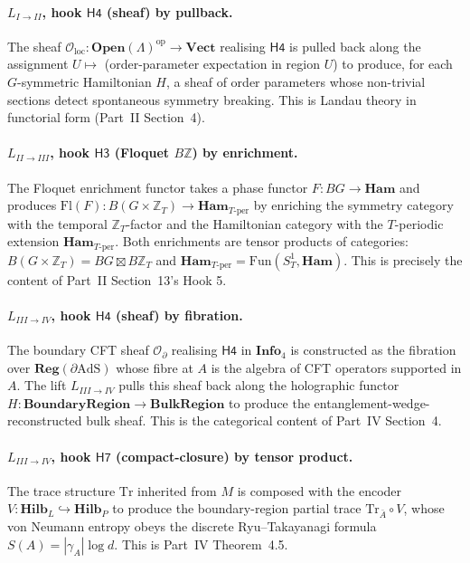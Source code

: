 \documentclass[12pt]{article}
\theoremstyle{definition}
\theoremstyle{remark}
\newcommand{\Info}{\mathbf{Info}}
\newcommand{\Hilb}{\mathbf{Hilb}}
\newcommand{\Vect}{\mathbf{Vect}}
\newcommand{\Ham}{\mathbf{Ham}}
\newcommand{\op}{\mathrm{op}}
\newcommand{\Tr}{\mathrm{Tr}}
\newcommand{\Z}{\mathbb{Z}}
\begin{document}
\paragraph{$L_{I \to II}$, hook $\mathsf{H4}$ (sheaf) by pullback.}
The sheaf $\mathcal{O}_{\mathrm{loc}} : \mathbf{Open}(\Lambda)^{\op} \to
\Vect$ realising $\mathsf{H4}$ is pulled back along the assignment
$U \mapsto$ (order-parameter expectation in region $U$) to produce, for
each $G$-symmetric Hamiltonian $H$, a sheaf of order parameters whose
non-trivial sections detect spontaneous symmetry breaking. This is
Landau theory in functorial form (Part~II Section~4).

\paragraph{$L_{II \to III}$, hook $\mathsf{H3}$ (Floquet $B\Z$) by
enrichment.}
The Floquet enrichment functor takes a phase functor $F : BG \to \Ham$
and produces $\mathrm{Fl}(F) : B(G \times \Z_T) \to \Ham_{T\text{-per}}$
by enriching the symmetry category with the temporal $\Z_T$-factor and
the Hamiltonian category with the $T$-periodic extension
$\Ham_{T\text{-per}}$. Both enrichments are tensor products of
categories: $B(G \times \Z_T) = BG \boxtimes B\Z_T$ and
$\Ham_{T\text{-per}} = \mathrm{Fun}(S^1_T, \Ham)$. This is precisely the
content of Part~II Section~13's Hook 5.

\paragraph{$L_{III \to IV}$, hook $\mathsf{H4}$ (sheaf) by fibration.}
The boundary CFT sheaf $\mathcal{O}_{\partial}$ realising $\mathsf{H4}$ in
$\Info_4$ is constructed as the fibration over $\mathbf{Reg}(\partial
\mathrm{AdS})$ whose fibre at $A$ is the algebra of CFT operators
supported in $A$. The lift $L_{III \to IV}$ pulls this sheaf back along
the holographic functor $H : \mathbf{BoundaryRegion} \to
\mathbf{BulkRegion}$ to produce the entanglement-wedge-reconstructed bulk
sheaf. This is the categorical content of Part~IV Section~4.

\paragraph{$L_{III \to IV}$, hook $\mathsf{H7}$ (compact-closure) by
tensor product.}
The trace structure $\Tr$ inherited from $M$ is composed with the
encoder $V : \Hilb_L \hookrightarrow \Hilb_P$ to produce the
boundary-region partial trace $\Tr_{\bar A} \circ V$, whose von Neumann
entropy obeys the discrete Ryu--Takayanagi formula $S(A) =
|\gamma_A| \log d$. This is Part~IV Theorem~4.5.
\end{document}
